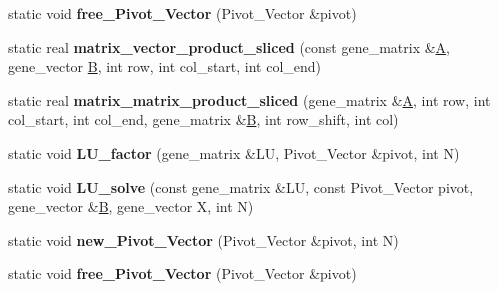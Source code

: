 \begin{DoxyCompactItemize}
\item 
\mbox{\label{classblitz___l_u__solve__interface_ae58840dbbcb44f84500e26d0a212b219}} 
static void {\bfseries free\+\_\+\+Pivot\+\_\+\+Vector} (Pivot\+\_\+\+Vector \&pivot)
\item 
\mbox{\label{classblitz___l_u__solve__interface_a9ffd8f9541d9559c4b0f6d0532587e76}} 
static real {\bfseries matrix\+\_\+vector\+\_\+product\+\_\+sliced} (const gene\+\_\+matrix \&\hyperlink{group___core___module_class_eigen_1_1_matrix}{A}, gene\+\_\+vector \hyperlink{group___core___module_class_eigen_1_1_matrix}{B}, int row, int col\+\_\+start, int col\+\_\+end)
\item 
\mbox{\label{classblitz___l_u__solve__interface_afebfcffc1b05ad809cc704a0aa54a26e}} 
static real {\bfseries matrix\+\_\+matrix\+\_\+product\+\_\+sliced} (gene\+\_\+matrix \&\hyperlink{group___core___module_class_eigen_1_1_matrix}{A}, int row, int col\+\_\+start, int col\+\_\+end, gene\+\_\+matrix \&\hyperlink{group___core___module_class_eigen_1_1_matrix}{B}, int row\+\_\+shift, int col)
\item 
\mbox{\label{classblitz___l_u__solve__interface_a35ac67142990402c20597bf9a8d8d9b9}} 
static void {\bfseries L\+U\+\_\+factor} (gene\+\_\+matrix \&LU, Pivot\+\_\+\+Vector \&pivot, int N)
\item 
\mbox{\label{classblitz___l_u__solve__interface_acb9e0965fe92bb88c1b6d4e2a78906be}} 
static void {\bfseries L\+U\+\_\+solve} (const gene\+\_\+matrix \&LU, const Pivot\+\_\+\+Vector pivot, gene\+\_\+vector \&\hyperlink{group___core___module_class_eigen_1_1_matrix}{B}, gene\+\_\+vector X, int N)
\item 
\mbox{\label{classblitz___l_u__solve__interface_adafba612b512655463cd9d1fa7239d8c}} 
static void {\bfseries new\+\_\+\+Pivot\+\_\+\+Vector} (Pivot\+\_\+\+Vector \&pivot, int N)
\item 
\mbox{\label{classblitz___l_u__solve__interface_ae58840dbbcb44f84500e26d0a212b219}} 
static void {\bfseries free\+\_\+\+Pivot\+\_\+\+Vector} (Pivot\+\_\+\+Vector \&pivot)

\end{DoxyCompactItemize}
